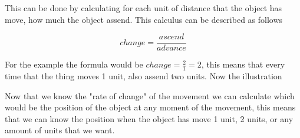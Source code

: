 \documentclass[12pt,journal]{IEEEtran}
\begin{document}
    This can be done by calculating for each unit of distance that the object
    has move, how much the object assend. This calculus can be  described as
    follows

    \begin{equation}
        change = \frac{ascend}{advance}
    \end{equation}

    \vspace{1cm}

    For the example the formula would be $change = \frac{2}{1} = 2$, this
    means that every time that the thing moves 1 unit, also assend two units.
    Now the illustration \\


    Now that we know the "rate of change" of the movement we can calculate which
    would be the position of the object at any moment of the movement, this means
    that we can know the position when the object has move 1 unit, 2 units, or
    any amount of units that we want.
\end{document}
